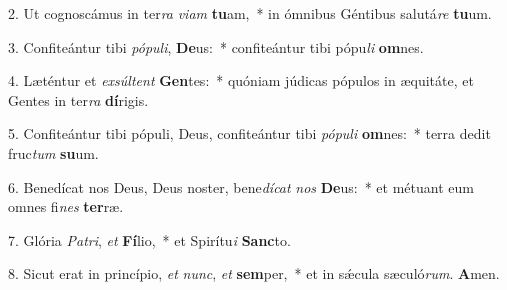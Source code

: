 2. Ut cognoscámus in ter\textit{ra} \textit{vi}\textit{am} \textbf{tu}am,~*  in ómnibus Géntibus salutá\textit{re} \textbf{tu}um.\

3. Confiteántur tibi \textit{pó}\textit{pu}\textit{li}, \textbf{De}us:~*  confiteántur tibi pópu\textit{li} \textbf{om}nes.\

4. Læténtur et \textit{ex}\textit{súl}\textit{tent} \textbf{Gen}tes:~*  quóniam júdicas pópulos in æquitáte, et Gentes in ter\textit{ra} \textbf{dí}rigis.\

5. Confiteántur tibi pópuli, Deus, confiteántur tibi \textit{pó}\textit{pu}\textit{li} \textbf{om}nes:~*  terra dedit fruc\textit{tum} \textbf{su}um.\

6. Benedícat nos Deus, Deus noster, bene\textit{dí}\textit{cat} \textit{nos} \textbf{De}us:~*  et métuant eum omnes fi\textit{nes} \textbf{ter}ræ.\

7. Glória \textit{Pa}\textit{tri}, \textit{et} \textbf{Fí}lio,~*  et Spirítu\textit{i} \textbf{Sanc}to.\

8. Sicut erat in princípio, \textit{et} \textit{nunc}, \textit{et} \textbf{sem}per,~*  et in sǽcula sæculó\textit{rum}. \textbf{A}men.\

